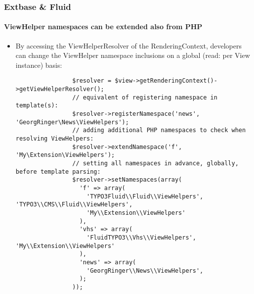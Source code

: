 \begin{frame}[fragile]
	\frametitle{Extbase \& Fluid}
	\framesubtitle{ViewHelper namespaces can be extended also from PHP}

	\lstset{basicstyle=\tiny\ttfamily}

	\begin{itemize}

		\item By accessing the ViewHelperResolver of the RenderingContext,
			developers can change the ViewHelper namespace inclusions on a global
			(read: per View instance) basis:

			\begin{lstlisting}
				$resolver = $view->getRenderingContext()->getViewHelperResolver();
				// equivalent of registering namespace in template(s):
				$resolver->registerNamespace('news', 'GeorgRinger\News\ViewHelpers');
				// adding additional PHP namespaces to check when resolving ViewHelpers:
				$resolver->extendNamespace('f', 'My\Extension\ViewHelpers');
				// setting all namespaces in advance, globally, before template parsing:
				$resolver->setNamespaces(array(
				  'f' => array(
				    'TYPO3Fluid\\Fluid\\ViewHelpers', 'TYPO3\\CMS\\Fluid\\ViewHelpers',
				    'My\\Extension\\ViewHelpers'
				  ),
				  'vhs' => array(
				    'FluidTYPO3\\Vhs\\ViewHelpers', 'My\\Extension\\ViewHelpers'
				  ),
				  'news' => array(
				    'GeorgRinger\\News\\ViewHelpers',
				  );
				));
			\end{lstlisting}
	\end{itemize}

\end{frame}


